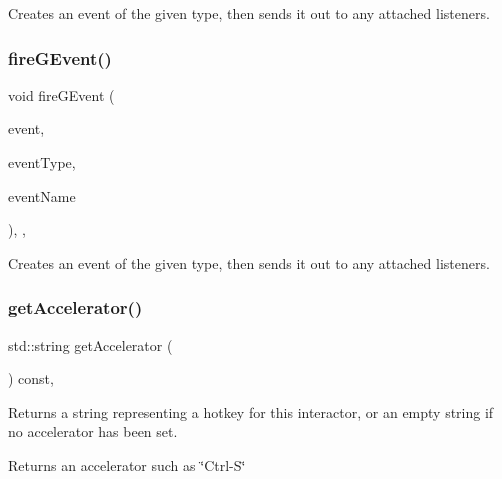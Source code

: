 Creates an event of the given type, then sends it out to any attached listeners. 

\mbox{\label{classGObservable_a2a70a7d7435ff0c3b80bb4d70da19e0d}} 
\subsubsection{\texorpdfstring{fire\+G\+Event()}{fireGEvent()}\hspace{0.1cm}{\footnotesize\ttfamily [8/8]}}
{\footnotesize\ttfamily void fire\+G\+Event (\begin{DoxyParamCaption}\item[{Q\+Window\+State\+Change\+Event $\ast$}]{event,  }\item[{Event\+Type}]{event\+Type,  }\item[{const std\+::string \&}]{event\+Name }\end{DoxyParamCaption})\hspace{0.3cm}{\ttfamily [protected]}, {\ttfamily [virtual]}, {\ttfamily [inherited]}}



Creates an event of the given type, then sends it out to any attached listeners. 

\mbox{\label{classGInteractor_a69f8d23ed8f207fbecad99960776e942}} 
\subsubsection{\texorpdfstring{get\+Accelerator()}{getAccelerator()}}
{\footnotesize\ttfamily std\+::string get\+Accelerator (\begin{DoxyParamCaption}{ }\end{DoxyParamCaption}) const\hspace{0.3cm}{\ttfamily [virtual]}, {\ttfamily [inherited]}}



Returns a string representing a hotkey for this interactor, or an empty string if no accelerator has been set. 

\begin{DoxyReturn}{Returns}
an accelerator such as \char`\"{}\+Ctrl-\/\+S\char`\"{} 
\end{DoxyReturn}


